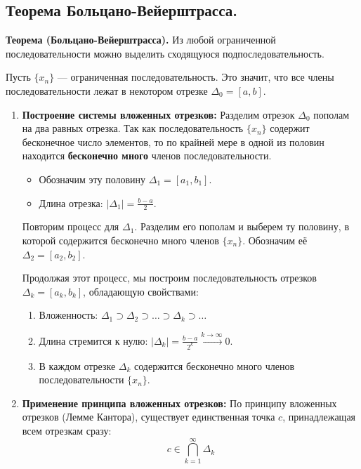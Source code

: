 \subsection{Теорема Больцано-Вейерштрасса.}

\textbf{Теорема (Больцано-Вейерштрасса).}
Из любой ограниченной последовательности можно выделить сходящуюся подпоследовательность.

\begin{tcolorbox}[title=Доказательство (через вложенные отрезки), breakable]
	Пусть $\{x_n\}$ — ограниченная последовательность.
	Это значит, что все члены последовательности лежат в некотором отрезке $\Delta_0 = [a, b]$.
	
	\begin{enumerate}
		\item \textbf{Построение системы вложенных отрезков:}
		Разделим отрезок $\Delta_0$ пополам на два равных отрезка.
		Так как последовательность $\{x_n\}$ содержит бесконечное число элементов, то по крайней мере в одной из половин находится \textbf{бесконечно много} членов последовательности.
		\begin{itemize}
			\item Обозначим эту половину $\Delta_1 = [a_1, b_1]$.
			\item Длина отрезка: $|\Delta_1| = \frac{b-a}{2}$.
		\end{itemize}
		
		Повторим процесс для $\Delta_1$. Разделим его пополам и выберем ту половину, в которой содержится бесконечно много членов $\{x_n\}$. Обозначим её $\Delta_2 = [a_2, b_2]$.
		
		Продолжая этот процесс, мы построим последовательность отрезков $\Delta_k = [a_k, b_k]$, обладающую свойствами:
		\begin{enumerate}
			\item Вложенность: $\Delta_1 \supset \Delta_2 \supset \dots \supset \Delta_k \supset \dots$
			\item Длина стремится к нулю: $|\Delta_k| = \frac{b-a}{2^k} \xrightarrow{k\to\infty} 0$.
			\item В каждом отрезке $\Delta_k$ содержится бесконечно много членов последовательности $\{x_n\}$.
		\end{enumerate}

		\item \textbf{Применение принципа вложенных отрезков:}
		По принципу вложенных отрезков (Лемме Кантора), существует единственная точка $c$, принадлежащая всем отрезкам сразу:
		$$ c \in \bigcap_{k=1}^{\infty} \Delta_k $$


\end{enumerate}
\end{tcolorbox}
